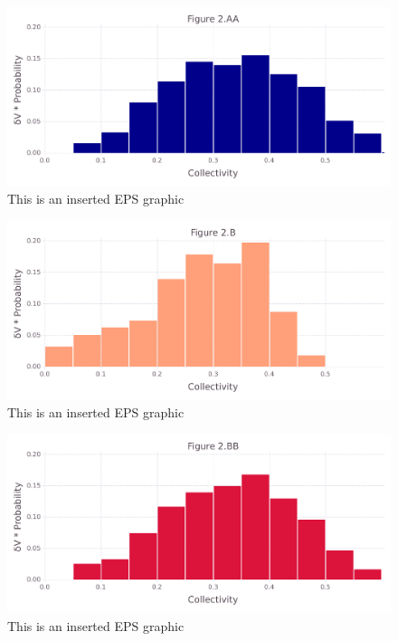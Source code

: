 \documentclass[10pt,letterpaper]{article}
\begin{document}
\begin{figure}[ht]
\begin{center}
\includegraphics[scale=0.5]{256l/2aafigure_hi-precision.pdf}
\caption{This is an inserted EPS graphic}
\label{fig4}
\end{center}
\end{figure}

\begin{figure}[ht]
\begin{center}
\includegraphics[scale=0.5]{256l/2bfigure_hi-precision.pdf}
\caption{This is an inserted EPS graphic}
\label{fig5}
\end{center}
\end{figure}

\begin{figure}[ht]
\begin{center}
\includegraphics[scale=0.5]{256l/2bbfigure_hi-precision.pdf}
\caption{This is an inserted EPS graphic}
\label{fig6}
\end{center}
\end{figure}
\end{document}

